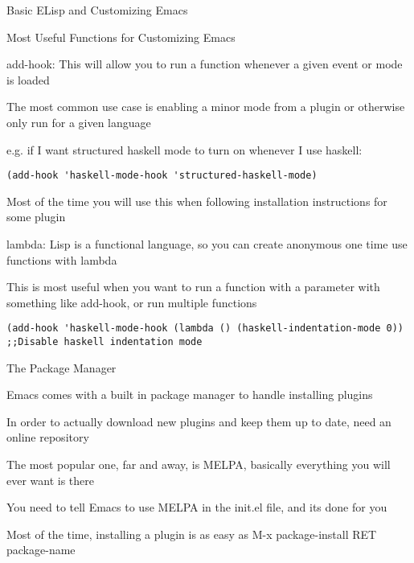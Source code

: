 \documentclass[presentation]{beamer}
\begin{document}
\begin{frame}[fragile,label=sec-5]{Basic ELisp and Customizing Emacs}
\begin{block}{Most Useful Functions for Customizing Emacs}
\begin{block}{add-hook: This will allow you to run a function whenever a given event or mode is loaded}
\begin{block}{The most common use case is enabling a minor mode from a plugin or otherwise only run for a given language}
\end{block}
\begin{block}{e.g. if I want structured haskell mode to turn on whenever I use haskell:}
\begin{verbatim}
(add-hook 'haskell-mode-hook 'structured-haskell-mode)
\end{verbatim}
\end{block}
\begin{block}{Most of the time you will use this when following installation instructions for some plugin}
\end{block}
\end{block}
\begin{block}{lambda: Lisp is a functional language, so you can create anonymous one time use functions with lambda}
\begin{block}{This is most useful when you want to run a function with a parameter with something like add-hook, or run multiple functions}
\begin{verbatim}
(add-hook 'haskell-mode-hook (lambda () (haskell-indentation-mode 0)) ;;Disable haskell indentation mode
\end{verbatim}
\end{block}
\end{block}
\end{block}
\begin{block}{The Package Manager}
\begin{block}{Emacs comes with a built in package manager to handle installing plugins}
\end{block}
\begin{block}{In order to actually download new plugins and keep them up to date, need an online repository}
\end{block}
\begin{block}{The most popular one, far and away, is MELPA, basically everything you will ever want is there}
\begin{block}{You need to tell Emacs to use MELPA in the init.el file, and its done for you}
\end{block}
\end{block}
\begin{block}{Most of the time, installing a plugin is as easy as M-x package-install RET package-name}

\end{block}
\end{block}
\end{frame}
\end{document}
